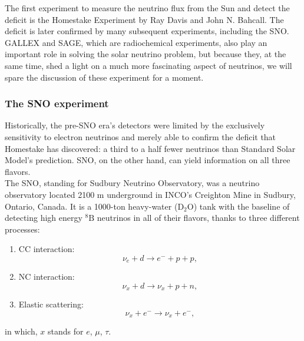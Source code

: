 The first experiment to measure the neutrino flux from the Sun and detect the deficit is the Homestake Experiment by Ray Davis and John N. Bahcall. The deficit is later confirmed by many subsequent experiments, including the SNO. GALLEX and SAGE, which are radiochemical experiments, also play an important role in solving the solar neutrino problem, but because they, at the same time, shed a light on a much more fascinating aspect of neutrinos, we will spare the discussion of these experiment for a moment.\\

\subsubsection{The SNO experiment}
Historically, the pre-SNO era's detectors were limited by the exclusively sensitivity to electron neutrinos and merely able to confirm the deficit that Homestake has discovered: a third to a half fewer neutrinos than Standard Solar Model's prediction. SNO, on the other hand, can yield information on all three flavors.\\

The SNO, standing for Sudbury Neutrino Observatory, was a neutrino observatory located 2100 m underground in INCO's Creighton Mine in Sudbury, Ontario, Canada. It is a 1000-ton heavy-water ($ \text{D}_2\text{O} $) tank with the baseline of detecting high energy $ ^8\text{B} $ neutrinos in all of their flavors, thanks to three different processes:
\begin{enumerate}
	\item CC interaction:
	\begin{equation}
		\nu_e + d \rightarrow e^- + p + p,
	\end{equation}
	\item NC interaction:
	\begin{equation}
		\nu_x + d \rightarrow \nu_x + p + n,
	\end{equation}
	\item Elastic scattering:
	\begin{equation}
		\nu_x + e^- \rightarrow \nu_x + e^-,
	\end{equation}
\end{enumerate}
in which, $ x $ stands for $e$, $ \mu $, $ \tau $.\\

